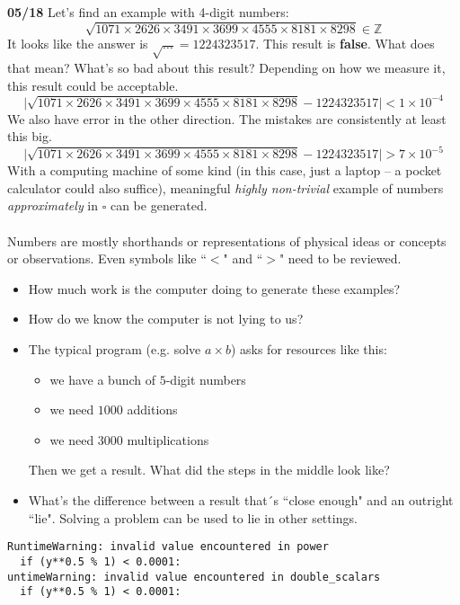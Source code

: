 \documentclass[12pt]{article}
\begin{document}
{ \fontsize{16pt}{16pt} \selectfont

\noindent \textbf{05/18} Let's find an example with 4-digit numbers:
$$ \sqrt{1071 \times 2626 \times 3491 \times 3699 \times 4555\times 8181 \times 8298 } \in \mathbb{Z}  $$
It looks like the answer is $\sqrt{\dots} = 1224323517$.  This result is \textbf{false}.  What does that mean?  What's so bad about this result?  Depending on how we measure it, this result could be acceptable.
$$ \Big|  \sqrt{1071 \times 2626 \times 3491 \times 3699 \times 4555\times 8181 \times 8298 } - 1224323517 \Big| <  1 \times 10^{-4} $$
We also have error in the other direction.  The mistakes are consistently at least this big.
$$ \Big|  \sqrt{1071 \times 2626 \times 3491 \times 3699 \times 4555\times 8181 \times 8298 } - 1224323517 \Big| >  7 \times 10^{-5}$$
With a computing machine of some kind (in this case, just a laptop -- a pocket calculator could also suffice), meaningful \textit{highly non-trivial} example of numbers \textit{approximately} in $\square$ can be generated.  \\ \\
Numbers are mostly shorthands or representations of physical ideas or concepts or observations. Even symbols like ``$<$" and ``$>$" need to be reviewed.
\begin{itemize}
\item  How much work is the computer doing to generate these examples?
\item  How do we know the computer is not lying to us?
\item The typical program (e.g. solve $a \times b$) asks for resources like this:
\begin{itemize}
\item we have a bunch of $5$-digit numbers
\item we need $1000$ additions
\item we need $3000$ multiplications
\end{itemize}
Then we get a result.  What did the steps in the middle look like?
\item What's the difference between a result that´s ``close enough" and an outright ``lie".  Solving a problem can be used to lie in other settings.  
\end{itemize}  

\begin{verbatim}
RuntimeWarning: invalid value encountered in power
  if (y**0.5 % 1) < 0.0001:
untimeWarning: invalid value encountered in double_scalars
  if (y**0.5 % 1) < 0.0001:


\end{verbatim}}
\end{document}
